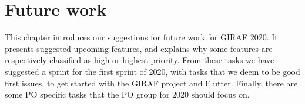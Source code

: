 \chapter{Future work}
This chapter introduces our suggestions for future work for GIRAF 2020. 
It presents suggested upcoming features, and explains why some features are respectively classified as high or highest priority.
From these tasks we have suggested a sprint for the first sprint of 2020, with tasks that we deem to be good first issues, to get started with the GIRAF project and Flutter.
Finally, there are some PO specific tasks that the PO group for 2020 should focus on.



